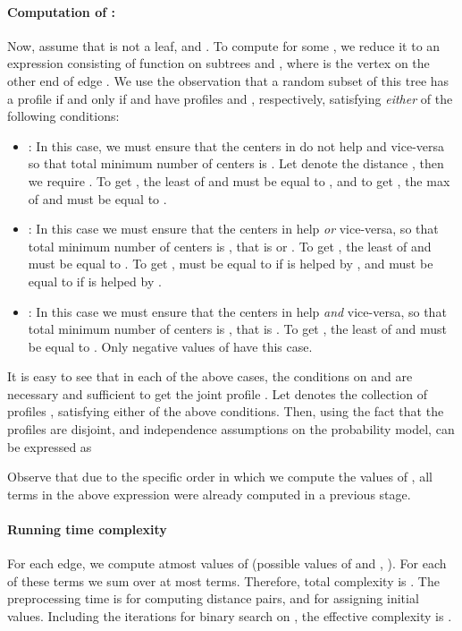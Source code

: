 \documentclass[11pt,onecolumn]{article}
\begin{document}
\paragraph{Computation of : }
Now, assume that  is not a leaf, and . 
To compute  for some , we reduce it to an expression consisting of function  on subtrees  and , where  is the vertex on the other end of edge . We use the observation that a random subset  
of this tree has a profile  if and only if  
and   have profiles  and , respectively, satisfying {\it either} of the following conditions:
\begin{itemize}
\item : In this case, we must ensure that the centers in  do not help  and vice-versa so that total 
minimum number of centers is . Let  denote the distance , then we require . To get , the least of  and  must be equal to 
, and to get , the max of  and  must be equal to .
\item : In this case we must ensure that the centers in  help  {\it or} vice-versa, so that total 
minimum number of centers is , that is  or . To get , the least of 
 and  must be equal to . To get ,  must be equal to  if  is helped by , and  
must be equal to  if  is helped by .
\item : In this case we must ensure that the centers in  help  {\it and} vice-versa, so that total
minimum number of centers is , that is . To get , the least of 
 and  must be equal to . Only negative values of  have this case.
\end{itemize}
It is easy to see that in each of the above cases, the conditions on  and  are necessary and sufficient to get the joint profile . Let  denotes the collection of profiles ,  satisfying either of the above conditions. 
Then, using the fact that the profiles are disjoint, and independence assumptions on the probability model,   can be expressed as

Observe that due to the specific order in which we compute the values of , all terms in the above expression were already computed in a previous stage. 

\paragraph{Running time complexity}
For each edge, we compute atmost  values of  (possible values of  and , ). For each of these 
terms we sum over at most  terms. Therefore, total complexity is . The preprocessing time is  for computing distance pairs, and  for assigning initial values. Including the  iterations for binary search on , the effective complexity is . 
\end{document}
